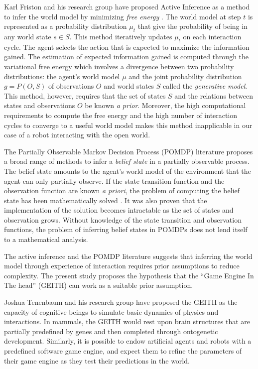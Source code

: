 \documentclass[runningheads]{llncs}
\begin{document}
Karl Friston and his research group have proposed Active Inference \cite[e.g.]{smith_step-by-step_2022} as a method to infer the world model by minimizing \textit{free energy} \cite{friston_free-energy_2010}.
The world model at step $t$ is represented as a probability distribution $\mu_t$ that give the probability of being in any world state $s \in S$. 
This method iteratively updates $\mu_t$ on each interaction cycle.
The agent selects the action that is expected to maximize the information gained. 
The estimation of expected information gained is computed through the variational free energy which involves a divergence between two probability distributions: the agent's world model $\mu$ and the joint probability distribution $g = P(O, S)$ of observations $O$ and world states $S$ called the \textit{generative model}. 
This method, however, requires that the set of states $S$ and the relations between states and observations $O$ be known \textit{a prior}. 
Moreover, the high computational requirements to compute the free energy and the high number of interaction cycles to converge to a useful world model makes this method inapplicable in our case of a robot interacting with the open world. 

The Partially Observable Markov Decision Process (POMDP) literature proposes a broad range of methods to infer a \textit{belief state} in a partially observable process.
The belief state amounts to the agent's world model of the environment that the agent can only partially observe.  
If the state transition function and the observation function are known \textit{a priori}, the problem of computing the belief state has been mathematically solved \cite{astrom1965optimal}. 
It was also proven that the implementation of the solution becomes intractable as the set of states and observation grows. 
Without knowledge of the state transition and observation functions, the problem of inferring belief states in POMDPs does not lend itself to a mathematical analysis. 

The active inference and the POMDP literature suggests that inferring the world model through experience of interaction requires prior assumptions to reduce complexity. 
The present study proposes the hypothesis that the ``Game Engine In The head'' (GEITH) can work as a suitable prior assumption. 

Joshua Tenenbaum and his research group have proposed the GEITH \cite{battaglia_simulation_2013} as the capacity of cognitive beings to simulate basic dynamics of physics and interactions. 
In mammals, the GEITH would rest upon brain structures that are partially predefined by genes and then completed through ontogenetic development.  
Similarly, it is possible to endow artificial agents and robots with a predefined software game engine, and expect them to refine the parameters of their game engine as they test their predictions in the world.
\end{document}
